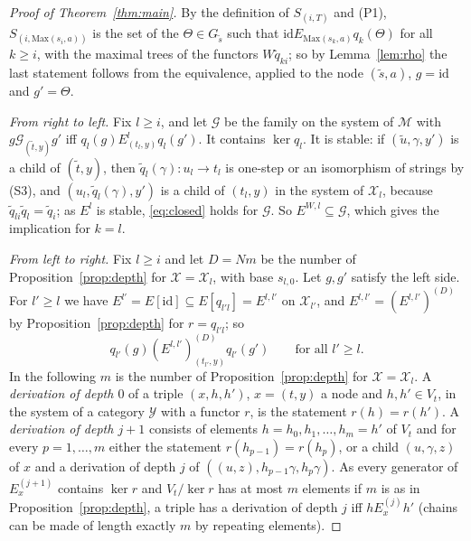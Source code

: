 \documentclass[11pt]{amsart}
\theoremstyle{definition}
\newcommand{\Max}{\mathrm{Max}}
\newcommand{\cX}{\mathcal X}
\newcommand{\cM}{\mathcal M}
\newcommand{\id}{\mathrm{id}}
\newcommand{\cY}{\mathcal Y}
\begin{document}
\begin{proof}[Proof of Theorem~\ref{thm:main}]
By the definition of $S_{(i,T)}$ and (P1), $S_{(i,\Max(s_i,a))}$ is
the set of the $\Theta\in G_{\tilde s}$ such that $\id\mathrel{
E_{\Max(s_k,a)}}q_k(\Theta)$ for all $k\ge i$, with the maximal trees
of the functors $W\tilde q_{ki}$; so by Lemma~\ref{lem:rho} the last
statement follows from the equivalence, applied to the node $(\tilde
s,a)$, $g=\id$ and $g'=\Theta$.

\emph{From right to left.} Fix $l\ge i$, and let $\mathcal G$ be the
family on the system of $\cM$ with $g\mathrel{\mathcal G_{(\tilde
t,y)}}g'$ iff $q_l(g)\mathrel{E^l_{(t_l,y)}}q_l(g')$. It contains
$\ker q_l$. It is stable: if $(\tilde u,\gamma,y')$ is a child of
$(\tilde t,y)$, then $\tilde q_l(\gamma)\colon u_l\to t_l$ is
one-step or an isomorphism of strings by (S3), and
$(u_l,\tilde q_l(\gamma),y')$ is a child of $(t_l,y)$ in the system
of $\cX_l$, because $\tilde q_{li}\tilde q_l=\tilde q_i$; as $E^l$ is
stable, \eqref{eq:closed} holds for $\mathcal G$. So $E^{W,l}\subseteq
\mathcal G$, which gives the implication for $k=l$.

\emph{From left to right.} Fix $l\ge i$ and let $D=Nm$ be the number
of Proposition~\ref{prop:depth} for $\cX=\cX_l$, with base $s_{l,0}$.
Let $g,g'$ satisfy the left side. For $l'\ge l$ we have
$E^{l'}=E[\id]\subseteq E[q_{l'l}]=E^{l,l'}$ on $\cX_{l'}$, and
$E^{l,l'}=(E^{l,l'})^{(D)}$ by Proposition~\ref{prop:depth} for
$r=q_{l'l}$; so
\begin{equation}\label{eq:stage}
q_{l'}(g)\mathrel{(E^{l,l'})^{(D)}_{(t_{l'},y)}}q_{l'}(g')\qquad
\text{for all }l'\ge l.
\end{equation}
In the following $m$ is the number of
Proposition~\ref{prop:depth} for $\cX=\cX_l$.
A \emph{derivation of depth $0$} of a triple $(x,h,h')$, $x=(t,y)$ a
node and $h,h'\in V_t$, in the system of a category $\cY$ with a
functor $r$, is the statement $r(h)=r(h')$. A \emph{derivation of
depth $j+1$} consists of elements $h=h_0,h_1,\dots,h_m=h'$ of $V_t$
and for every $p=1,\dots,m$ either the statement $r(h_{p-1})=r(h_p)$,
or a child $(u,\gamma,z)$ of $x$ and a derivation of depth $j$ of
$((u,z),h_{p-1}\gamma,h_p\gamma)$. As every generator of
$E^{(j+1)}_x$ contains $\ker r$ and $V_t/\ker r$ has at most $m$
elements if $m$ is as in Proposition~\ref{prop:depth}, a triple has a
derivation of depth $j$ iff $h\mathrel{E^{(j)}_x}h'$ (chains can be
made of length exactly $m$ by repeating elements).


\end{proof}
\end{document}
